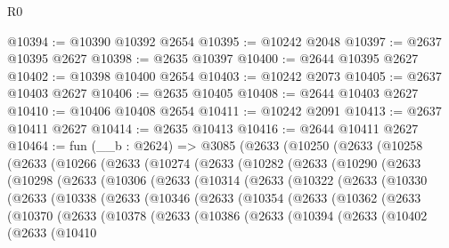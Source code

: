 \begin{lexlean}{R0}
\begin{coremodule}
@10394 := @10390 @10392 @2654
@10395 := @10242 @2048
@10397 := @2637 @10395 @2627
@10398 := @2635 @10397
@10400 := @2644 @10395 @2627
@10402 := @10398 @10400 @2654
@10403 := @10242 @2073
@10405 := @2637 @10403 @2627
@10406 := @2635 @10405
@10408 := @2644 @10403 @2627
@10410 := @10406 @10408 @2654
@10411 := @10242 @2091
@10413 := @2637 @10411 @2627
@10414 := @2635 @10413
@10416 := @2644 @10411 @2627
@10464 := fun (__b : @2624) =>
  @3085
    (@2633
      (@10250
        (@2633
          (@10258
            (@2633
              (@10266
                (@2633
                  (@10274
                    (@2633
                      (@10282
                        (@2633
                          (@10290
                            (@2633
                              (@10298
                                (@2633
                                  (@10306
                                    (@2633
                                      (@10314
                                        (@2633
                                          (@10322
                                            (@2633
                                              (@10330
                                                (@2633
                                                  (@10338
                                                    (@2633
                                                      (@10346
                                                        (@2633
                                                          (@10354
                                                            (@2633
                                                              (@10362
                                                                (@2633
                                                                  (@10370
                                                                    (@2633
                                                                      (@10378
                                                                        (@2633
                                                                          (@10386
                                                                            (@2633
                                                                              (@10394
                                                                                (@2633
                                                                                  (@10402
                                                                                    (@2633
                                                                                      (@10410

\end{coremodule}
\end{lexlean}
